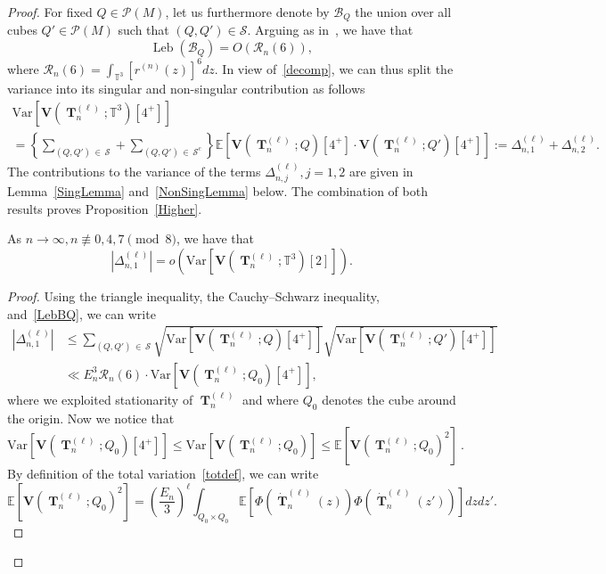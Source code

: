 \documentclass[AHL,Unicode,longabstracts,published]{cedram}
\DeclareMathOperator{\Leb}{Leb}
\DeclareMathOperator{\bT}{\mathbf{T}}
\newcommand{\bfv}{\mathbf{V}}
\newcommand{\clP}{\mathcal{P}}
\newcommand{\clS}{\mathcal{S}}
\newcommand{\clR}{\mathcal{R}}
\newcommand{\clB}{\mathcal{B}}
\newcommand{\T}{\mathbb{T}^3}
\newcommand{\E}[1]{\mathbb{E}\left[#1\right]}
\newcommand{\V}[1]{\mathrm{Var}{\left[#1\right]}}
\newcommand{\notcon}[3]{ {#1} \not\equiv {#2} \pmod {#3} }
\begin{document}
\begin{proof}
For fixed $Q \in \clP(M)$, let us furthermore denote by $\clB_Q$ the union over all cubes $Q' \in \clP(M)$ such that $(Q,Q') \in \clS$. Arguing as in~\cite[Lemma~6.3]{DNPR16}, we have that
\begin{equation}\label{LebBQ}
\Leb(\clB_Q) = O(\clR_n(6)),
\end{equation}
where $\clR_n(6)=\int_{\T} [r^{(n)}(z)]^6 dz$. In view of~\eqref{decomp}, we can thus split the variance into its singular and non-singular contribution as follows
\begin{multline*}
\V{\bfv\left(\bT_n^{(\ell)};\T\right)\left[4^+\right]}\\
= \left\{\sum_{(Q,Q')\,\in\,\clS } + \sum_{(Q,Q')\,\in\,\clS^c}\right\}
\E{\bfv\left(\bT_n^{(\ell)};Q\right)\left[4^+\right] \cdot \bfv\left(\bT_n^{(\ell)};Q'\right)\left[4^+\right]} := \Delta_{n,1}^{(\ell)} + \Delta_{n,2}^{(\ell)}.
\end{multline*}
The contributions to the variance of the terms $\Delta_{n,j}^{(\ell)}, j=1,2$ are given in Lemma~\ref{SingLemma} and~\ref{NonSingLemma} below. The combination of both results proves Proposition~\ref{Higher}.
\begin{lemm}\label{SingLemma}
As $n \to \infty, \notcon{n}{0,4,7}{8}$, we have that
\[
\left| \Delta_{n,1}^{(\ell)}\right| = o\left(\V{\bfv\left(\bT_n^{(\ell)};\T\right)[2]}\right).
\]
\end{lemm}
\begin{proof}
Using the triangle inequality, the Cauchy--Schwarz inequality, and~\eqref{LebBQ}, we can write
\begin{align}\label{EstOne}
\left|\Delta_{n,1}^{(\ell)}\right| &\leq \sum_{(Q,Q')\,\in\,\clS}
\sqrt{\V{\bfv\left(\bT_n^{(\ell)};Q\right)\left[4^+\right]}}
\sqrt{\V{\bfv\left(\bT_n^{(\ell)};Q'\right)\left[4^+\right]}} \\
&\ll E_n^3 \clR_n(6)
\cdot \V{\bfv\left(\bT_n^{(\ell)};Q_0\right)\left[4^+\right]},
\end{align}
where we exploited stationarity of $\bT_n^{(\ell)}$ and where $Q_0$ denotes the cube around the origin. Now we notice that
\begin{equation*}
\V{\bfv\left(\bT_n^{(\ell)};Q_0\right)\left[4^+\right]} \leq \V{\bfv\left(\bT_n^{(\ell)};Q_0\right)}
\leq \E{\bfv\left(\bT_n^{(\ell)};Q_0\right)^2} \ .
\end{equation*}
By definition of the total variation~\eqref{totdef}, we can write
\[
\E{\bfv\left(\bT_n^{(\ell)};Q_0\right)^2} = \left(\frac{E_n}{3}\right)^{\ell}
\int_{Q_0\times Q_0} \E{ \Phi\left(\dot{\bT}_n^{(\ell)}(z)\right) \Phi\left(\dot{\bT}_n^{(\ell)}(z')\right) } dzdz'.
\]
\end{proof}
\end{proof}
\end{document}
